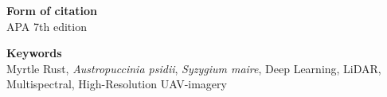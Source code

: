 \thispagestyle{empty}
\vspace*{\fill}


\vspace{0.5cm}

\noindent\textbf{Form of citation}\\
APA 7th edition

\noindent\textbf{Keywords}\\
Myrtle Rust, \textit{Austropuccinia psidii}, \textit{Syzygium maire}, Deep Learning, LiDAR, Multispectral, High-Resolution UAV-imagery
\newpage